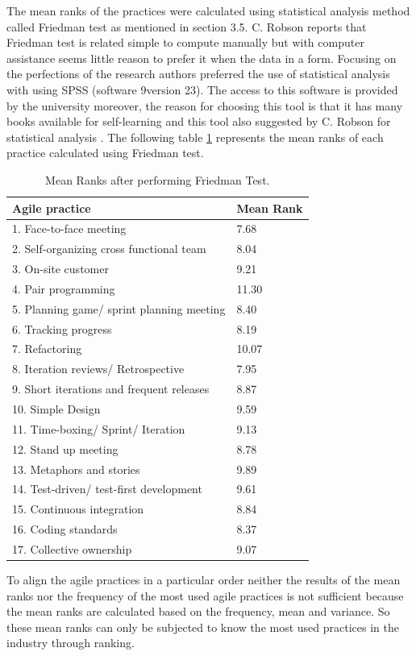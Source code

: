 \documentclass[a4paper,oneside]{bth}
\begin{document}
\newpage
The mean ranks of the practices were calculated using statistical analysis method called Friedman test as mentioned in section 3.5. C. Robson \cite{robson_real_2016} reports that Friedman test is related simple to compute manually but with computer assistance seems little reason to prefer it when the data in a form. Focusing on the perfections of the research authors preferred the use of statistical analysis with using SPSS (software 9version 23). The access to this software is provided by the university moreover, the reason for choosing this tool is that it has many books available for self-learning and this tool also suggested by C. Robson for statistical analysis \cite{robson_real_2016}. The following table \ref{mean ranks} represents the mean ranks of each practice calculated using Friedman test.
\begin{longtable}{|p{5cm}|p{4cm}|}
\caption{Mean Ranks after performing Friedman Test.  \label{mean ranks}}\\ \hline
\textbf{Agile practice} & \textbf{Mean Rank}\\ \hline
1. Face-to-face meeting&	7.68\\ \hline
2. Self-organizing cross functional team &	8.04\\ \hline
3. On-site customer&	9.21\\ \hline
4. Pair programming&	11.30\\ \hline
5. Planning game/ sprint planning meeting&	8.40\\ \hline
6. Tracking progress&	8.19\\ \hline
7. Refactoring&	10.07\\ \hline
8. Iteration reviews/ Retrospective&	7.95\\ \hline
9. Short iterations and frequent releases&	8.87\\ \hline
10. Simple Design&	9.59\\ \hline
11. Time-boxing/ Sprint/ Iteration&	9.13\\ \hline
12. Stand up meeting&	8.78\\ \hline
13. Metaphors and stories&	9.89\\ \hline
14. Test-driven/ test-first development&	9.61\\ \hline
15. Continuous integration& 	8.84\\ \hline 
16. Coding standards&	8.37\\ \hline
17. Collective ownership&	9.07\\ \hline
\end{longtable}
To align the agile practices in a particular order neither the results of the mean ranks nor the frequency of the most used agile practices is not sufficient because the mean ranks are calculated based on the frequency, mean and variance. So these mean ranks can only be subjected to know the most used practices in the industry through ranking.
\end{document}
